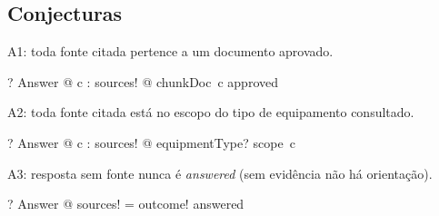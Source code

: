 \documentclass{article}
\begin{document}
\subsection*{Conjecturas}

A1: toda fonte citada pertence a um documento aprovado.

\begin{zed}
  \vdash? \forall Answer @ \forall c : sources! @ chunkDoc~c \in approved
\end{zed}

A2: toda fonte citada está no escopo do tipo de equipamento consultado.

\begin{zed}
  \vdash? \forall Answer @ \forall c : sources! @ equipmentType? \in scope~c
\end{zed}

A3: resposta sem fonte nunca é \emph{answered} (sem evidência não há orientação).

\begin{zed}
  \vdash? \forall Answer @ sources! = \emptyset \implies outcome! \neq answered
\end{zed}

\end{document}
